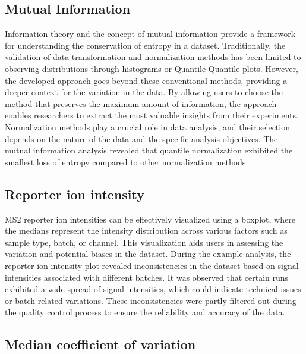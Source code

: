\documentclass[
  11pt,
]{article}
\begin{document}
\hypertarget{mutual-information}{%
\subsection{Mutual Information}\label{mutual-information}}

Information theory and the concept of mutual information provide a
framework for understanding the conservation of entropy in a dataset.
Traditionally, the validation of data transformation and normalization
methods has been limited to observing distributions through histograms
or Quantile-Quantile plots. However, the developed approach goes beyond
these conventional methods, providing a deeper context for the variation
in the data. By allowing users to choose the method that preserves the
maximum amount of information, the approach enables researchers to
extract the most valuable insights from their experiments. Normalization
methods play a crucial role in data analysis, and their selection
depends on the nature of the data and the specific analysis objectives.
The mutual information analysis revealed that quantile normalization
exhibited the smallest loss of entropy compared to other normalization
methods

\hypertarget{reporter-ion-intensity}{%
\subsection{Reporter ion intensity}\label{reporter-ion-intensity}}

MS2 reporter ion intensities can be effectively visualized using a
boxplot, where the medians represent the intensity distribution across
various factors such as sample type, batch, or channel. This
visualization aids users in assessing the variation and potential biases
in the dataset. During the example analysis, the reporter ion intensity
plot revealed inconsistencies in the dataset based on signal intensities
associated with different batches. It was observed that certain runs
exhibited a wide spread of signal intensities, which could indicate
technical issues or batch-related variations. These inconsistencies were
partly filtered out during the quality control process to ensure the
reliability and accuracy of the data.

\hypertarget{median-coefficient-of-variation}{%
\subsection{Median coefficient of
variation}\label{median-coefficient-of-variation}}
\end{document}
